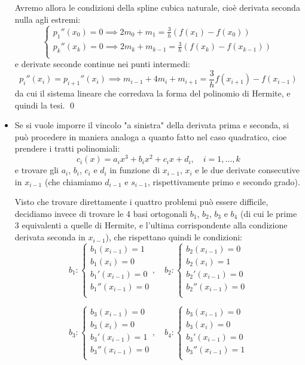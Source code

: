 \documentclass[a4paper,11pt]{article}
\begin{document}
\begin{itemize}
	Avremo allora le condizioni della spline cubica naturale, cioè derivata seconda nulla agli estremi:
	\[
		\begin{cases}	
			p_1''(x_0) = 0 \implies 2m_0 + m_1 = \frac{3}{h} \left( f(x_1) - f(x_0) \right) \\
			p_k''(x_k) = 0 \implies 2m_k + m_{k - 1} = \frac{3}{h} \left( f(x_k) - f(x_{k - 1}) \right) \\
		\end{cases}
	\]
	e derivate seconde continue nei punti intermedi:
	$$
		p_i''(x_i) = p_{i+1}''(x_{i}) \implies m_{i - 1} + 4 m_i + m_{i + 1} = \frac{3}{h} f(x_{i + 1}) - f(x_{i - 1})
	$$
	da cui il sistema lineare che corredava la forma del polinomio di Hermite, e quindi la tesi. \qed

	\item Se si vuole imporre il vincolo "a sinistra" della derivata prima e seconda, si può procedere in maniera analoga a quanto fatto nel caso quadratico, cioe prendere i tratti polinomiali:
		$$
		c_i(x) = a_i x^3 + b_i x^2 + c_i x + d_i, \quad i = 1, ..., k
		$$
		e trovare gli $a_i$, $b_i$, $c_i$ e $d_i$ in funzione di $x_{i - 1}$, $x_i$ e le due derivate consecutive in $x_{i - 1}$ (che chiamiamo $d_{i - 1}$ e $s_{i- 1}$, rispettivamente primo e secondo grado).
		
		Visto che trovare direttamente i quattro problemi può essere difficile, decidiamo invece di trovare le 4 basi ortogonali $b_1$, $b_2$, $b_3$ e $b_4$ (di cui le prime 3 equivalenti a quelle di Hermite, e l'ultima corrispondente alla condizione derivata seconda in $x_{i - 1}$), che rispettano quindi le condizioni:
		$$
		b_1 : 
			\begin{cases}
				b_1(x_{i - 1}) = 1 \\
				b_1(x_i) = 0 \\
				b_1'(x_{i - 1}) = 0 \\
				b_1''(x_{i - 1}) = 0 \\
			\end{cases}, \quad
		b_2 : 
			\begin{cases}
				b_2(x_{i - 1}) = 0 \\
				b_2(x_i) = 1 \\
				b_2'(x_{i - 1}) = 0 \\
				b_2''(x_{i - 1}) = 0 \\
			\end{cases}
		$$

		$$
		b_3 : 
			\begin{cases}
				b_3(x_{i - 1}) = 0 \\
				b_3(x_i) = 0 \\
				b_3'(x_{i - 1}) = 1 \\
				b_3''(x_{i - 1}) = 0 \\
			\end{cases}, \quad
		b_4 : 
			\begin{cases}
				b_3(x_{i - 1}) = 0 \\
				b_3(x_i) = 0 \\
				b_3'(x_{i - 1}) = 0 \\
				b_3''(x_{i - 1}) = 1 \\
			\end{cases}
		$$


\end{itemize}
\end{document}
